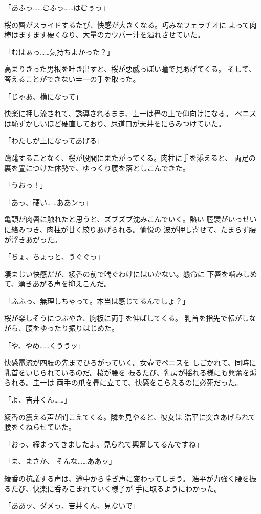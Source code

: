 ﻿\documentclass[
    book,tate,
    line_length=30zw,
    jafontsize=12pt,
    paper=b5j,
    landscape,
    ]{jlreq}
\begin{document}
「あふっ……むふっ……はむぅっ」

桜の唇がスライドするたび、快感が大きくなる。巧みなフェラチオに
よって肉棒はますます硬くなり、大量のカウパー汁を溢れさせていた。

「むはぁっ……気持ちよかった？」

高まりきった男根を吐き出すと、桜が悪戯っぽい瞳で見あげてくる。
そして、答えることができない圭一の手を取った。

「じゃあ、横になって」

快楽に押し流されて、誘導されるまま、圭一は畳の上で仰向けになる。
ペニスは恥ずかしいほど硬直しており、尿道口が天井をにらみつけていた。

「わたしが上になってあげる」

躊躇することなく、桜が股間にまたがってくる。肉柱に手を添えると、
両足の裏を畳につけた体勢で、ゆっくり腰を落としこんできた。

「うおっ！」

「あっ、硬い……ああンっ」

亀頭が肉唇に触れたと思うと、ズブズブ沈みこんでいく。熱い
膣襞がいっせいに絡みつき、肉柱が甘く絞りあげられる。愉悦の
波が押し寄せて、たまらず腰が浮きあがった。

「ちょ、ちょっと、うぐぐっ」

凄まじい快感だが、綾香の前で喘ぐわけにはいかない。懸命に
下唇を噛みしめて、湧きあがる声を抑えこんだ。

「ふふっ、無理しちゃって。本当は感じてるんでしょ？」

桜が楽しそうにつぶやき、胸板に両手を伸ばしてくる。
乳首を指先で転がしながら、腰をゆったり振りはじめた。

「や、やめ……くううッ」

快感電流が四肢の先までひろがっていく。女壺でペニスを
しごかれて、同時に乳首をいじられているのだ。桜が腰を
振るたび、乳房が揺れる様にも興奮を煽られる。圭一は
両手の爪を畳に立てて、快感をこらえるのに必死だった。

「よ、吉井くん……」

綾香の震える声が聞こえてくる。隣を見やると、彼女は
浩平に突きあげられて腰をくねらせていた。

「おっ、締まってきましたよ。見られて興奮してるんですね」

「ま、まさか、 そんな……ああッ」

綾香の抗議する声は、途中から喘ぎ声に変わってしまう。
浩平が力強く腰を振るたび、快楽に呑みこまれていく様子が
手に取るようにわかった。

「ああッ、ダメっ、吉井くん、見ないで」
\end{document}
